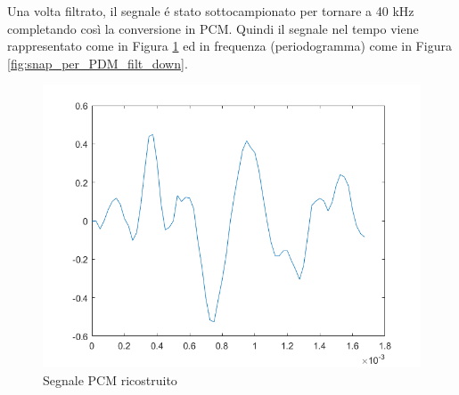 \documentclass[a4paper, titlepage]{article}
\begin{document}
\noindent Una volta filtrato, il segnale é stato sottocampionato per tornare a 40 kHz completando così la conversione in PCM. Quindi il segnale nel tempo viene rappresentato come in Figura \ref{fig:snap_PDM_filt_down} ed in frequenza (periodogramma) come in Figura \ref{fig:snap_per_PDM_filt_down}.
\begin{figure}[H]
    \centering
    \includegraphics[scale=0.4]{filt_down.png}
    \caption{Segnale PCM ricostruito}
    \label{fig:snap_PDM_filt_down}
\end{figure}
\end{document}
